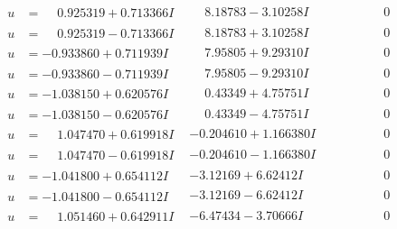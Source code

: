 \documentclass[1p]{elsarticle_modified}
\theoremstyle{definition}
\begin{document}
$$\begin{array}{c|c|c}
\begin{aligned}
u &= \phantom{-}0.925319 + 0.713366 I\end{aligned}
 & \phantom{-}8.18783 - 3.10258 I & \phantom{-0.000000 } 0 \\ \hline\begin{aligned}
u &= \phantom{-}0.925319 - 0.713366 I\end{aligned}
 & \phantom{-}8.18783 + 3.10258 I & \phantom{-0.000000 } 0 \\ \hline\begin{aligned}
u &= -0.933860 + 0.711939 I\end{aligned}
 & \phantom{-}7.95805 + 9.29310 I & \phantom{-0.000000 } 0 \\ \hline\begin{aligned}
u &= -0.933860 - 0.711939 I\end{aligned}
 & \phantom{-}7.95805 - 9.29310 I & \phantom{-0.000000 } 0 \\ \hline\begin{aligned}
u &= -1.038150 + 0.620576 I\end{aligned}
 & \phantom{-}0.43349 + 4.75751 I & \phantom{-0.000000 } 0 \\ \hline\begin{aligned}
u &= -1.038150 - 0.620576 I\end{aligned}
 & \phantom{-}0.43349 - 4.75751 I & \phantom{-0.000000 } 0 \\ \hline\begin{aligned}
u &= \phantom{-}1.047470 + 0.619918 I\end{aligned}
 & -0.204610 + 1.166380 I & \phantom{-0.000000 } 0 \\ \hline\begin{aligned}
u &= \phantom{-}1.047470 - 0.619918 I\end{aligned}
 & -0.204610 - 1.166380 I & \phantom{-0.000000 } 0 \\ \hline\begin{aligned}
u &= -1.041800 + 0.654112 I\end{aligned}
 & -3.12169 + 6.62412 I & \phantom{-0.000000 } 0 \\ \hline\begin{aligned}
u &= -1.041800 - 0.654112 I\end{aligned}
 & -3.12169 - 6.62412 I & \phantom{-0.000000 } 0 \\ \hline\begin{aligned}
u &= \phantom{-}1.051460 + 0.642911 I\end{aligned}
 & -6.47434 - 3.70666 I & \phantom{-0.000000 } 0 \\ \hline\begin{aligned}

\end{aligned}
\end{array}$$
\end{document}
